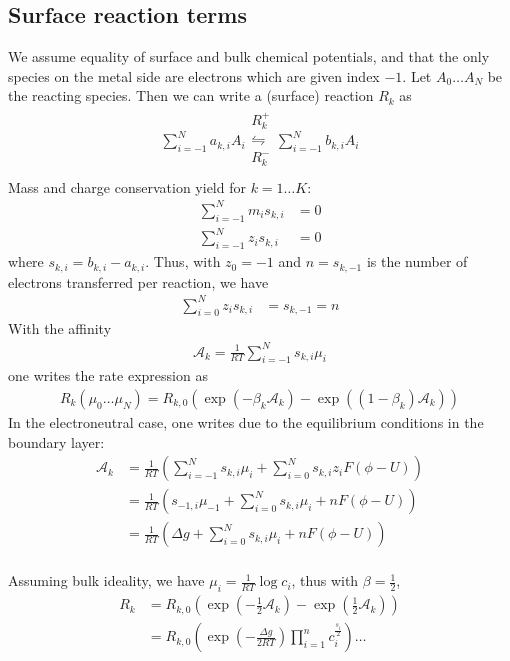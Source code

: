 \documentclass[12pt,oneside,reqno]{amsart}
\numberwithin{equation}{section}
\begin{document}
\subsection{Surface reaction terms}
We assume equality of surface and bulk chemical potentials, and that the only species on the metal
side are electrons which are given index $-1$.
Let $A_0\dots A_N$ be the reacting species. Then we can write a (surface) reaction $R_k$ as
\begin{align}
  \sum_{i=-1}^N a_{k,i} A_i
  \begin{array}{c}
     R_k^+\\
    \leftrightharpoons \\
     R_k^-\\
  \end{array}
  \sum_{i=-1}^N b_{k,i} A_i
\end{align}
Mass and charge conservation yield for $k=1\dots K$:
\begin{align}
  \sum_{i=-1}^N m_i s_{k,i}&=0\\
  \sum_{i=-1}^N z_i s_{k,i}&=0
\end{align}
where $s_{k,i}=b_{k,i}-a_{k,i}$.
Thus, with $z_0=-1$ and $n=s_{k,-1}$ is the number of electrons
transferred per reaction, we have
\begin{align}
  \sum_{i=0}^N z_i s_{k,i}&=s_{k,-1}=n
\end{align}
With the affinity
\begin{align}
  \mathcal A_k = \frac{1}{RT}\sum_{i=-1}^Ns_{k,i}\mu_i
\end{align}
one writes the rate expression as
\begin{align}
  R_k(\mu_0\dots\mu_N)= R_{k,0}\left(\exp(-\beta_k\mathcal A_k) - \exp((1-\beta_k)\mathcal A_k)\right)
\end{align}
In the electroneutral case, one writes due to the equilibrium conditions in the boundary layer:
\begin{align}
  \mathcal A_k &= \frac{1}{RT}\left(\sum_{i=-1}^Ns_{k,i}\mu_i + \sum_{i=0}^Ns_{k,i}z_iF(\phi -U)\right)\\
               &= \frac{1}{RT}\left(s_{-1,i}\mu_{-1}+ \sum_{i=0}^Ns_{k,i}\mu_i + nF(\phi -U)\right)\\
               &= \frac{1}{RT}\left(\Delta g+ \sum_{i=0}^Ns_{k,i}\mu_i + nF(\phi -U)\right)\\
\end{align}

Assuming bulk ideality, we  have $\mu_i=\frac1{RT}\log c_i$, thus with $\beta=\frac12$,
\begin{align}
  R_k&= R_{k,0}\left(\exp(-\frac12\mathcal A_k) - \exp(\frac12\mathcal A_k)\right)\\
     &= R_{k,0}\left(\exp(-\frac{\Delta g}{2RT})\prod_{i=1}^nc_i^{\frac{s_i}{2}}\right)\dots
\end{align}
\end{document}
